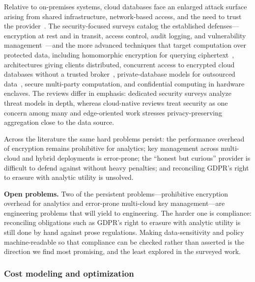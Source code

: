 \documentclass[a4paper,fleqn]{cas-sc}
\begin{document}
Relative to on-premises systems, cloud databases face an enlarged attack surface arising from shared infrastructure, network-based access, and the need to trust the provider~\cite{Fuhrt2010CloudSecurity,Zubi2009DistSec,Waghmare2015CloudDBSec}. The security-focused surveys catalog the established defenses---encryption at rest and in transit, access control, audit logging, and vulnerability management~\cite{Sanka2022CloudSecSurvey,Ferrari2009DBaaSSec,Munir2015DBaaSSec,Khan2019DaaSAnalytic}---and the more advanced techniques that target computation over protected data, including homomorphic encryption for querying ciphertext~\cite{Acar2018HE,Ravan2013EncQuery}, architectures giving clients distributed, concurrent access to encrypted cloud databases without a trusted broker~\cite{Ferretti2014Encrypted}, private-database models for outsourced data~\cite{Cuzzocrea2016PrivateDB}, secure multi-party computation, and confidential computing in hardware enclaves. The reviews differ in emphasis: dedicated security surveys analyze threat models in depth, whereas cloud-native reviews treat security as one concern among many and edge-oriented work stresses privacy-preserving aggregation close to the data source.

Across the literature the same hard problems persist: the performance overhead of encryption remains prohibitive for analytics; key management across multi-cloud and hybrid deployments is error-prone; the ``honest but curious'' provider is difficult to defend against without heavy penalties; and reconciling GDPR's right to erasure with analytic utility is unsolved.

\textbf{Open problems.} Two of the persistent problems---prohibitive encryption overhead for analytics and error-prone multi-cloud key management---are engineering problems that will yield to engineering. The harder one is compliance: reconciling obligations such as GDPR's right to erasure with analytic utility is still done by hand against prose regulations. Making data-sensitivity and policy machine-readable so that compliance can be checked rather than asserted is the direction we find most promising, and the least explored in the surveyed work.

\subsubsection{Cost modeling and optimization}
\label{subsubsec:cost}
\end{document}
